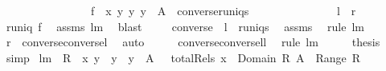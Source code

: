 \begin{isabellebody}
\ \ \ \ \ \ \ \ \ \ \ \ \ \ \ \ {\isachardoublequoteopen}{\isacharbraceleft}f\ {\isasymunion}\ {\isacharbraceleft}{\isacharparenleft}x{\isacharcomma}\ y{\isacharparenright}{\isacharbraceright}{\isacharbar}\ y{\isachardot}\ y\ {\isasymin}\ A{\isacharbraceright}\ {\isasymsubseteq}\ converse{\isacharbackquote}runiqs{\isachardoublequoteclose}\ \isanewline
\ \ \ \ \ \ \ \ \ \ \ \ \ {\isacharparenleft}\ {\isachardoublequoteopen}{\isacharquery}l\ {\isasymsubseteq}\ {\isacharquery}r{\isachardoublequoteclose}{\isacharparenright}\isanewline
%
\isadelimproof
%
\endisadelimproof
%
\isatagproof
{}\isamarkupfalse%
\ {\isacharminus}\isanewline
\ \ \isamarkupfalse%
\ {\isachardoublequoteopen}runiq\ {\isacharparenleft}f{\isacharcircum}{\isacharminus}{}{\isacharparenright}{\isachardoublequoteclose}\ \isamarkupfalse%
\ assms{\isacharparenleft}{}{\isacharparenright}\ lm{}{}\ \isamarkupfalse%
\ blast\ \isamarkupfalse%
\isanewline
\ \ \isamarkupfalse%
\ {\isachardoublequoteopen}converse\ {\isacharbackquote}\ {\isacharquery}l\ {\isasymsubseteq}\ runiqs{\isachardoublequoteclose}\ \isamarkupfalse%
\ assms{\isacharparenleft}{}{\isacharparenright}\ \isamarkupfalse%
\ {\isacharparenleft}rule\ lm{}{}{\isacharparenright}\ \isanewline
\ \ \isamarkupfalse%
\ \isamarkupfalse%
\ {\isachardoublequoteopen}{\isacharquery}r\ {\isasymsupseteq}\ converse{\isacharbackquote}{\isacharparenleft}converse{\isacharbackquote}{\isacharquery}l{\isacharparenright}{\isachardoublequoteclose}\ \isamarkupfalse%
\ auto\isanewline
\ \ \isamarkupfalse%
\ \isamarkupfalse%
\ {\isachardoublequoteopen}converse{\isacharbackquote}{\isacharparenleft}converse{\isacharbackquote}{\isacharquery}l{\isacharparenright}{\isacharequal}{\isacharquery}l{\isachardoublequoteclose}\ \isamarkupfalse%
\ {\isacharparenleft}rule\ lm{}{}{\isacharparenright}\isanewline
\ \ \isamarkupfalse%
\ \isamarkupfalse%
\ {\isacharquery}thesis\ \isamarkupfalse%
\ simp\isanewline
{}\isamarkupfalse%
%
\endisatagproof
{\isafoldproof}%
%
\isadelimproof
\isanewline
%
\endisadelimproof
\isanewline
{}\isamarkupfalse%
\ lm{}{}{\isacharcolon}\ {\isachardoublequoteopen}{\isacharbraceleft}\ R\ {\isasymunion}\ {\isacharbraceleft}{\isacharparenleft}x{\isacharcomma}\ y{\isacharparenright}{\isacharbraceright}\ {\isacharbar}\ y\ {\isachardot}\ y\ {\isasymin}\ A\ {\isacharbraceright}\ {\isasymsubseteq}\ totalRels\ {\isacharparenleft}{\isacharbraceleft}x{\isacharbraceright}\ {\isasymunion}\ Domain\ R{\isacharparenright}\ {\isacharparenleft}A\ {\isasymunion}\ Range\ R{\isacharparenright}{\isachardoublequoteclose}\ \isanewline

\end{isabellebody}
